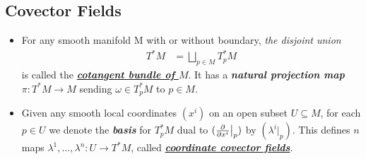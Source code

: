 \documentclass[11pt]{article}
\begin{document}
\subsection{Covector Fields}
\begin{itemize}
\item \begin{definition}
For any smooth manifold M with or without boundary, \emph{the disjoint union}
\begin{align*}
T^{*}M &= \bigsqcup_{p \in M}T_{p}^{*}M
\end{align*} is called the \underline{\emph{\textbf{cotangent bundle of $M$}}}. It has a \emph{\textbf{natural projection map}} $\pi: T^{*}M \rightarrow M$ sending $\omega \in T_{p}^{*}M$ to $p \in M$. 
\end{definition}


\item
\begin{definition}
Given any smooth local coordinates $(x^i)$ on an open subset $U \subseteq M$, for each $p \in U$ we denote the \emph{\textbf{basis}} for $T_{p}^{*}M$ dual to $(\frac{\partial }{ \partial x^{i}}\big|_{p})$ by $(\lambda^{i}\big|_{p})$. This defines $n$ maps $\lambda^1,\ldots, \lambda^n: U \rightarrow  T^{*}M$, called \underline{\emph{\textbf{coordinate covector fields}}}.
\end{definition}



\end{itemize}
\end{document}
